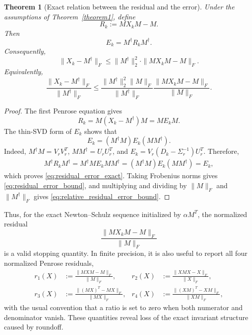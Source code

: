 \documentclass[12pt,a4paper]{article}
\theoremstyle{plain}
\newtheorem{theorem}{Theorem}[section]
\theoremstyle{definition}
\theoremstyle{remark}
\begin{document}
\begin{theorem}[Exact relation between the residual and the error]
\label{thm:residual_error}
Under the assumptions of Theorem~\ref{theorem1}, define
\[
    R_k:=MX_kM-M.
\]
Then
\begin{equation} \label{eq:residual_error_exact}
    E_k=M^\dagger R_kM^\dagger.
\end{equation}
Consequently,
\begin{equation} \label{eq:residual_error_bound}
    \|X_k-M^\dagger\|_F \leq \|M^\dagger\|_2^2 \cdot \|MX_kM-M\|_F.
\end{equation}
Equivalently,
\begin{equation} \label{eq:relative_residual_error_bound}
    \frac{\|X_k-M^\dagger\|_F}{\|M^\dagger\|_F} \leq \frac{\|M^\dagger\|_2^2\|M\|_F}{\|M^\dagger\|_F} \frac{\|MX_kM-M\|_F}{\|M\|_F}.
\end{equation}
\end{theorem}

\begin{proof}
The first Penrose equation gives
\[
    R_k=M(X_k-M^\dagger)M=ME_kM.
\]
The thin-SVD form of \(E_k\) shows that
\[
    E_k=(M^\dagger M)E_k(MM^\dagger).
\]
Indeed, \(M^\dagger M=V_rV_r^T\), \(MM^\dagger=U_rU_r^T\), and \(E_k=V_r(D_k-\Sigma_r^{-1})U_r^T\). Therefore,
\begin{align*}
    M^\dagger R_kM^\dagger = M^\dagger ME_kMM^\dagger =(M^\dagger M)E_k(MM^\dagger)=E_k,
\end{align*}
which proves \eqref{eq:residual_error_exact}. Taking Frobenius norms gives \eqref{eq:residual_error_bound}, and multiplying and dividing by \(\|M\|_F\) and \(\|M^\dagger\|_F\) gives \eqref{eq:relative_residual_error_bound}.
\end{proof}

Thus, for the exact Newton--Schulz sequence initialized by \(\alpha M^T\), the normalized residual
\[
    \frac{\|MX_kM-M\|_F}{\|M\|_F}
\]
is a valid stopping quantity. In finite precision, it is also useful to report all four normalized Penrose residuals,
\begin{align*}
    r_1(X)&:=\frac{\|MXM-M\|_F}{\|M\|_F},
    & r_2(X)&:=\frac{\|XMX-X\|_F}{\|X\|_F},\\ r_3(X)&:=\frac{\|(MX)^T-MX\|_F}{\|MX\|_F}, 
    & r_4(X)&:=\frac{\|(XM)^T-XM\|_F}{\|XM\|_F},
\end{align*}
with the usual convention that a ratio is set to zero when both numerator and denominator vanish. These quantities reveal loss of the exact invariant structure caused by roundoff.
\end{document}
